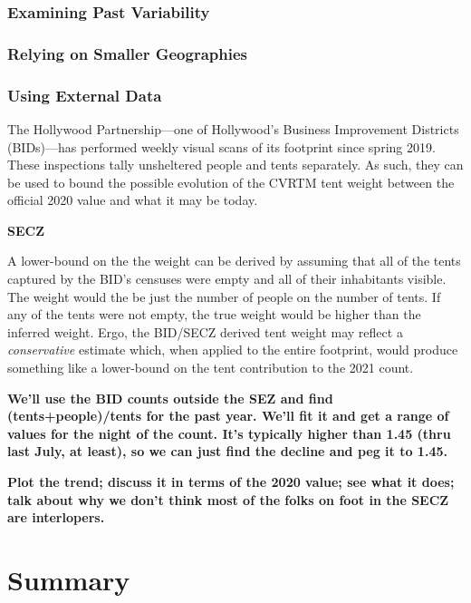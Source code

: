 \documentclass[11pt,twocolumn]{article}
\def\bfr{\bf\color{red}}
\def\Count{count}
\begin{document}
\subsubsection{Examining Past Variability}
\label{sec:pastValues}

\subsubsection{Relying on Smaller Geographies}
\label{sec:cdWts}

\subsubsection{Using External Data}
\label{sec:bidData}

The Hollywood Partnership---one of Hollywood's Business Improvement Districts (BIDs)---has performed
weekly visual scans of its footprint since spring 2019. These inspections tally unsheltered people and 
tents separately. As such, they can be used to bound the possible evolution of the CVRTM tent weight
between the official 2020 value and what it may be today.

{\bfr SECZ}

A lower-bound on the the weight can be derived by assuming that all of the tents captured by the BID's 
censuses were empty and all of their inhabitants visible. The weight would the be just the number of
people on the number of tents. If any of the tents were not empty, the true weight would be higher than
the inferred weight. Ergo, the BID/SECZ derived tent weight may reflect a {\it conservative} estimate 
which, when applied to the entire footprint, would produce something like a lower-bound on the 
tent contribution to the 2021 \Count.

{\bfr We'll use the BID counts outside the SEZ and find (tents+people)/tents for the past year. We'll
fit it and get a range of values for the night of the count. It's typically higher than 1.45 (thru last July,
at least), so we can just find the decline and peg it to 1.45.}

{\bfr Plot the trend; discuss it in terms of the 2020 value; see what it does; talk about why we don't
think most of the folks on foot in the SECZ are interlopers.}

\section{Summary}
\label{sec:summary}

\appendix
\end{document}
